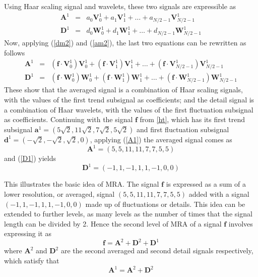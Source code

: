 \documentclass[a4paper,11pt]{report}
\begin{document}
Using Haar scaling signal and wavelets, these two signals are expressible as
\begin{eqnarray}
\mathbf{A}^{1} &=& a_{0}\mathbf{V}_{0}^{1}+a_{1}\mathbf{V}_{1}^{1}+\ldots+a_{N/2-1}\mathbf{V}_{N/2-1}^{1} \label{A1} \\
\mathbf{D}^{1} &=& d_{0}\mathbf{W}_{0}^{1}+d_{1}\mathbf{W}_{1}^{1}+\ldots+d_{N/2-1}\mathbf{W}_{N/2-1}^{1} \label{D1}
\end{eqnarray}
Now, applying (\ref{dm2}) and (\ref{am2}), the last two equations can be rewritten as follows
\begin{eqnarray*}
\mathbf{A}^{1} &=& (\mathbf{f}\cdot\mathbf{V}_{0}^{1})\mathbf{V}_{0}^{1}+(\mathbf{f}\cdot\mathbf{V}_{1}^{1})\mathbf{V}_{1}^{1}+\ldots+(\mathbf{f}\cdot\mathbf{V}_{N/2-1}^{1})\mathbf{V}_{N/2-1}^{1} \\
\mathbf{D}^{1} &=& (\mathbf{f}\cdot\mathbf{W}_{0}^{1})\mathbf{W}_{0}^{1}+(\mathbf{f}\cdot\mathbf{W}_{1}^{1})\mathbf{W}_{1}^{1}+\ldots+(\mathbf{f}\cdot\mathbf{W}_{N/2-1}^{1})\mathbf{W}_{N/2-1}^{1} 
\end{eqnarray*}
These show that the averaged signal is a combination of Haar scaling signals, with the values of the first trend subsignal as coefficients; and the detail signal is a combination of Haar wavelets, with the values of the first fluctuation subsignal as coefficients. Continuing with the signal $\mathbf{f}$ from \ref{ht}, which has its first trend subsignal $\mathbf{a}^{1}=(5\sqrt{2},11\sqrt{2},7\sqrt{2},5\sqrt{2})$ and first fluctuation subsignal $\mathbf{d}^{1}=(-\sqrt{2},-\sqrt{2},\sqrt{2},0)$, applying (\ref{A1}) the averaged signal comes as
\begin{equation}
\mathbf{A}^{1} = (5,5,11,11,7,7,5,5)
\end{equation}
and (\ref{D1}) yields
\begin{equation}
\mathbf{D}^{1} = (-1,1,-1,1,1,-1,0,0)
\end{equation}

This illustrates the basic idea of MRA. The signal $\mathbf{f}$ is expressed as a sum of a lower resolution, or averaged, signal $(5,5,11,11,7,7,5,5)$ added with a signal $(-1,1,-1,1,1,-1,0,0)$ made up of fluctuations or details. This idea can be extended to further levels, as many levels as the number of times that the signal length can be divided by 2. Hence the second level of MRA of a signal $\mathbf{f}$ involves expressing it as
\begin{equation}
\mathbf{f} = \mathbf{A}^{2} + \mathbf{D}^{2} + \mathbf{D}^{1}
\end{equation}
where $\mathbf{A}^{2}$ and $\mathbf{D}^{2}$ are the second averaged and second detail signals respectively, which satisfy that
\begin{equation}
\mathbf{A}^{1} = \mathbf{A}^{2} + \mathbf{D}^{2}
\end{equation}
\end{document}
